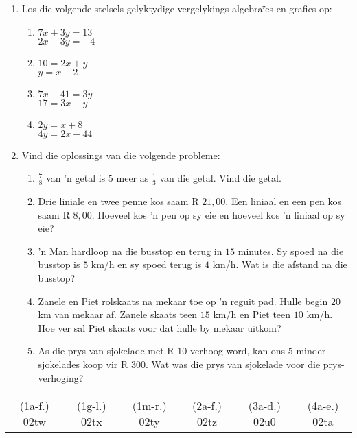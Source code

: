 \begin{eocexercises}{}
\begin{enumerate}[itemsep=5pt, label=\textbf{\arabic*}. ]
\item Los die volgende stelsels gelyktydige vergelykings algebra\"ies en grafies op:

\begin{enumerate}[itemsep=5pt,label=\textbf{(\alph*)}]
\item $7x+3y=13$\\$2x-3y=-4$  
\item $10=2x+y$\\$y=x-2$
\item $7x-41=3y$\\$17=3x-y$
\item $2y=x+8$\\$4y=2x-44$
\end{enumerate}

\item Vind die oplossings van die volgende probleme:

\begin{enumerate}[itemsep=5pt,label=\textbf{(\alph*)}]
\item $\frac{7}{8}$ van ’n getal is $5$ meer as $\frac{1}{3}$ van die getal. Vind die getal.

\item Drie liniale en twee penne kos saam R $21,00$. Een liniaal en een pen kos saam R
$8,00$. Hoeveel kos ’n pen op sy eie en hoeveel kos ’n liniaal op sy eie?

\item ’n Man hardloop na die busstop en terug in $15$ minutes. Sy spoed na die busstop is
$5$ km/h en sy spoed terug is $4$ km/h. Wat is die afstand na die busstop?
\item Zanele en Piet rolskaats na mekaar toe op ’n reguit pad. Hulle begin $20$ km van
mekaar af. Zanele skaats teen $15$ km/h en Piet teen $10$ km/h. Hoe ver sal Piet skaats
voor dat hulle by mekaar uitkom?

\item As die prys van sjokelade met R $10$ verhoog word, kan ons $5$ minder sjokelades
koop vir R $300$. Wat was die prys van sjokelade voor die prys-verhoging?

   

\end{enumerate}
\end{enumerate}
\practiceinfo
\par 
\par \begin{tabular}[h]{cccccc} 
(1a-f.) 02tw &  (1g-l.) 02tx & (1m-r.) 02ty &  (2a-f.) 02tz &  (3a-d.) 02u0 &  (4a-e.) 02ta\end{tabular}

\end{eocexercises}